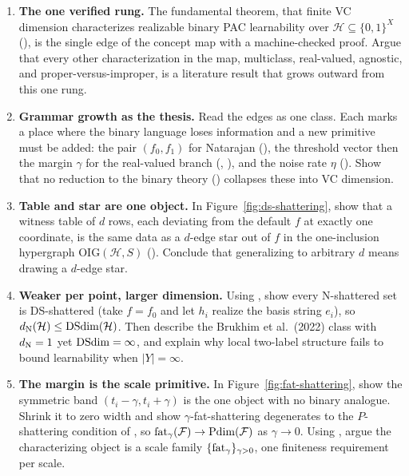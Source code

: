 \begin{enumerate}[leftmargin=*,itemsep=3pt]
\item \textbf{The one verified rung.} The fundamental theorem, that finite VC
dimension characterizes realizable binary PAC learnability over $\mathcal{H}
\subseteq \{0,1\}^X$ (), is the single edge of the
concept map with a machine-checked proof.  Argue that every other characterization
in the map, multiclass, real-valued, agnostic, and proper-versus-improper, is a
literature result that grows outward from this one rung.

\item \textbf{Grammar growth as the thesis.} Read the  edges
as one class.  Each marks a place where the binary language loses information and a
new primitive must be added: the pair $(f_0, f_1)$ for Natarajan
(), the threshold vector then the margin $\gamma$ for the
real-valued branch (, ), and
the noise rate $\eta$ ().  Show that no reduction to the
binary theory () collapses these into VC dimension.

\item \textbf{Table and star are one object.} In Figure~\ref{fig:ds-shattering},
show that a witness table of $d$ rows, each deviating from the default $f$ at
exactly one coordinate, is the same data as a $d$-edge star out of $f$ in the
one-inclusion hypergraph $\mathrm{OIG}(\mathcal H, S)$ ().  Conclude
that generalizing to arbitrary $d$ means drawing a $d$-edge star.

\item \textbf{Weaker per point, larger dimension.} Using ,
show every N-shattered set is DS-shattered (take $f = f_0$ and let $h_i$ realize
the basis string $e_i$), so $d_{\mathrm{N}}(\mathcal H) \le \mathrm{DSdim}(\mathcal H)$.  Then
describe the Brukhim et al.\ (2022) class with $d_{\mathrm{N}} = 1$ yet $\mathrm{DSdim} = \infty$,
and explain why local two-label structure fails to bound learnability when
$|Y| = \infty$.

\item \textbf{The margin is the scale primitive.} In
Figure~\ref{fig:fat-shattering}, show the symmetric band $(t_i-\gamma, t_i+\gamma)$
is the one object with no binary analogue.  Shrink it to zero width and show
$\gamma$-fat-shattering degenerates to the $P$-shattering condition of
, so $\mathrm{fat}_\gamma(\mathcal F) \to \mathrm{Pdim}(\mathcal F)$ as
$\gamma \to 0$.  Using , argue the characterizing object is
a scale family $\{\mathrm{fat}_\gamma\}_{\gamma > 0}$, one finiteness requirement per
scale.


\end{enumerate}
